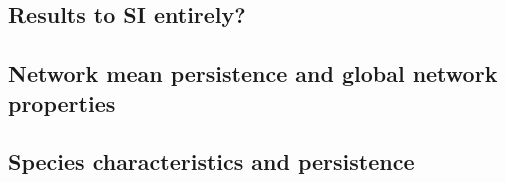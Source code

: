 \documentclass[12pt]{article}
\begin{document}
\begin{spacing}{2.0}
     \clearpage

\section*{Results to SI entirely?}

    \subsection*{Network mean persistence and global network properties}
    


    \subsection*{Species characteristics and persistence}
    

    

\end{spacing}
\end{document}
